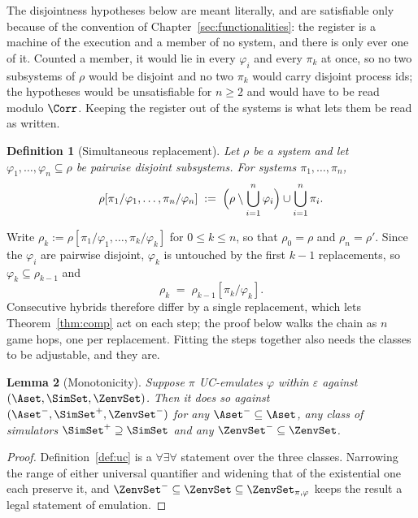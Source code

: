 \documentclass[10pt,oneside,openany]{book}
\theoremstyle{accentdef}
\newtheorem{definition}{Definition}[chapter]
\theoremstyle{accentplain}
\newtheorem{lemma}[definition]{Lemma}
\begin{document}
The disjointness hypotheses below are meant literally, and are satisfiable only because of the
convention of Chapter~\ref{sec:functionalities}: the register is a machine of the execution and a
member of no system, and there is only ever one of it. Counted a member, it would lie in every
$\varphi_i$ and every $\pi_k$ at once, so no two subsystems of $\rho$ would be disjoint and no two
$\pi_k$ would carry disjoint process ids; the hypotheses would be unsatisfiable for $n \geq 2$ and
would have to be read modulo $\Corr$. Keeping the register out of the systems is what lets them be
read as written.

\begin{definition}[Simultaneous replacement]\label{def:multirepl}
Let $\rho$ be a system and let $\varphi_1,\dots,\varphi_n \subseteq \rho$ be pairwise disjoint
subsystems. For systems $\pi_1,\dots,\pi_n$,
\[
  \rho[\pi_1/\varphi_1,\dots,\pi_n/\varphi_n] \;:=\; \Bigl(\rho \setminus \bigcup_{i=1}^{n} \varphi_i\Bigr) \cup \bigcup_{i=1}^{n} \pi_i .
\]
\end{definition}

Write $\rho_k := \rho[\pi_1/\varphi_1,\dots,\pi_k/\varphi_k]$ for $0 \leq k \leq n$, so that
$\rho_0 = \rho$ and $\rho_n = \rho'$. Since the $\varphi_i$ are pairwise disjoint, $\varphi_k$
is untouched by the first $k-1$ replacements, so $\varphi_k \subseteq \rho_{k-1}$ and
\[
  \rho_k \;=\; \rho_{k-1}[\pi_k/\varphi_k] .
\]
Consecutive hybrids therefore differ by a single replacement, which lets Theorem~\ref{thm:comp}
act on each step; the proof below walks the chain as $n$ game hops, one per replacement. Fitting
the steps together also needs the classes to be adjustable, and they are.

\begin{lemma}[Monotonicity]\label{lem:mono}
Suppose $\pi$ UC-emulates $\varphi$ within $\varepsilon$ against $(\Aset,\SimSet,\ZenvSet)$.
Then it does so against $(\Aset^{-},\SimSet^{+},\ZenvSet^{-})$ for any $\Aset^{-} \subseteq \Aset$,
any class of simulators $\SimSet^{+} \supseteq \SimSet$ and any $\ZenvSet^{-} \subseteq \ZenvSet$.
\end{lemma}

\begin{proof}
Definition~\ref{def:uc} is a $\forall\exists\forall$ statement over the three classes.
Narrowing the range of either universal quantifier and widening that of the existential one
each preserve it, and $\ZenvSet^{-} \subseteq \ZenvSet \subseteq \ZenvSet_{\pi,\varphi}$ keeps
the result a legal statement of emulation.
\end{proof}
\end{document}
